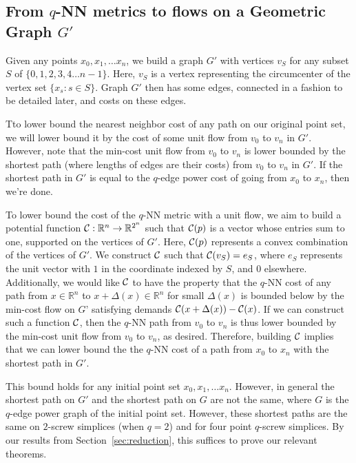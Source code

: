 \subsection{From $q$-NN metrics to flows on a Geometric Graph $G'$}

Given any points $x_0, x_1, \ldots x_n$, we build a graph $G'$ with
vertices $v_S$ for any subset $S$ of
$\{0,1,2,3,4 \ldots n-1 \}$. Here, $v_S$ is a vertex representing the
circumcenter of the vertex set $\{x_s: s \in S\}$. Graph $G'$ then has some
edges, connected in a fashion to be detailed later, and costs on these edges.

Tto lower bound the nearest neighbor cost of any path on our original point
set, we will lower bound it by the cost of some unit flow from
$v_0$ to $v_n$ in $G'$. However, note that the min-cost
unit flow from $v_0$ to $v_n$ is lower bounded by the shortest path (where
lengths of edges are their costs) from $v_0$ to $v_n$ in $G'$.
If the shortest path in $G'$ is equal to the $q$-edge power cost of going
from $x_0$ to $x_n$, then we're done.

To lower bound the cost of the $q$-NN metric with a unit flow, we aim to build
a potential function $\mathcal{C}:\mathbb{R}^n \rightarrow \mathbb{R}^{2^n}$ such
that $\mathcal{C}(p)$ is a vector whose entries sum to one, supported on the
vertices of $G'$. Here, $\mathcal{C}(p)$
represents a convex combination of the vertices of $G'$. We construct $\mathcal{C}$
such that $\mathcal{C}(v_S) = e_S$, where $e_S$ represents the unit vector with $1$
in the coordinate indexed by $S$, and $0$ elsewhere. Additionally, we would
like $\mathcal{C}$ to have
the property that the $q$-NN cost of any path from $x \in \mathbb{R}^n$ to
$x+\Delta(x) \in \mathbb{R}^n$ for small $\Delta(x)$ is
bounded below by the min-cost flow on $G’$ satisfying demands
$\mathcal{C}(x+\Delta(x)) - \mathcal{C}(x)$. If we can construct such a function $\mathcal{C}$,
then the $q$-NN path from $v_0$ to $v_n$ is thus lower bounded by the min-cost
unit flow from $v_0$ to $v_n$, as desired.
 Therefore, building $\mathcal{C}$ implies that we can lower bound the
the $q$-NN cost of a path from $x_0$ to $x_n$ with the shortest path in $G'$.

This bound holds for any initial point set $x_0, x_1, \ldots x_n$. However,
in general the shortest path on $G'$ and the shortest path on $G$ are not
the same, where $G$ is the $q$-edge power graph of the initial point set.
However, these shortest paths are the same
on $2$-screw simplices (when $q=2$) and for four point $q$-screw
simplices. By our results from Section~\ref{sec:reduction}, this suffices
to prove our relevant theorems.


